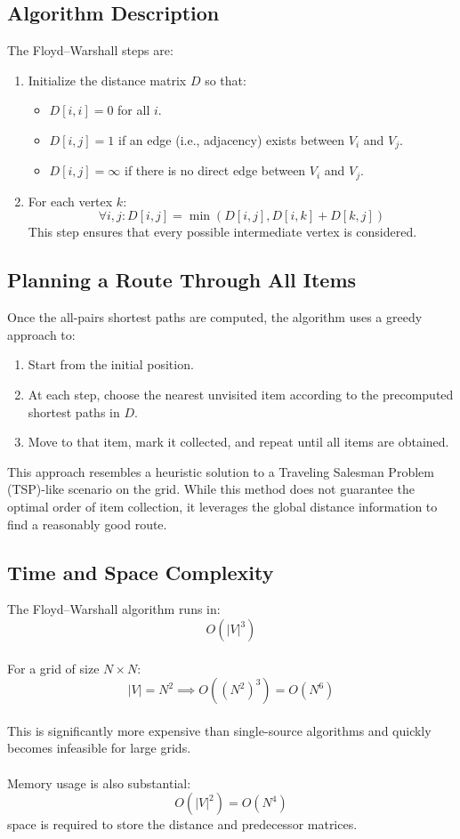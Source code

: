 \documentclass[12pt]{article}
\begin{document}
\subsection{Algorithm Description}
The Floyd–Warshall steps are:
\begin{enumerate}
    \item Initialize the distance matrix \( D \) so that:
    \begin{itemize}
        \item \( D[i,i] = 0 \) for all \( i \).
        \item \( D[i,j] = 1 \) if an edge (i.e., adjacency) exists between \( V_i \) and \( V_j \).
        \item \( D[i,j] = \infty \) if there is no direct edge between \( V_i \) and \( V_j \).
    \end{itemize}
    \item For each vertex \( k \):
    \[
    \forall i,j: D[i,j] = \min(D[i,j], D[i,k] + D[k,j])
    \]
    This step ensures that every possible intermediate vertex is considered.
\end{enumerate}

\subsection{Planning a Route Through All Items}
Once the all-pairs shortest paths are computed, the algorithm uses a greedy approach to:
\begin{enumerate}
    \item Start from the initial position.
    \item At each step, choose the nearest unvisited item according to the precomputed shortest paths in \( D \).
    \item Move to that item, mark it collected, and repeat until all items are obtained.
\end{enumerate}

\noindent This approach resembles a heuristic solution to a Traveling Salesman Problem (TSP)-like scenario on the grid. While this method does not guarantee the optimal order of item collection, it leverages the global distance information to find a reasonably good route.

\subsection{Time and Space Complexity}
The Floyd–Warshall algorithm runs in:
\[
O(|V|^3)
\]
\\
\noindent For a grid of size \( N \times N \):
\[
|V| = N^2 \implies O((N^2)^3) = O(N^6)
\]
\\
\noindent This is significantly more expensive than single-source algorithms and quickly becomes infeasible for large grids.
\\
\\
\noindent Memory usage is also substantial:
\[
O(|V|^2) = O(N^4)
\]
\noindent space is required to store the distance and predecessor matrices.
\end{document}
